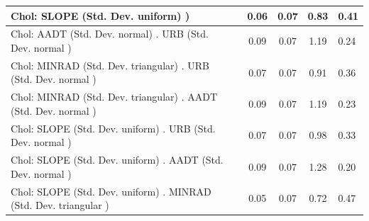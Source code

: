 \begin{table}
\begin{center}
\begin{tabular}{|l|l|c|c|c|l|}
			\hline
			 Chol: SLOPE (Std. Dev. uniform) ) &  & 0.06 & 0.07 & 0.83 & 0.41 \\
			\hline
			 Chol: AADT (Std. Dev. normal) . URB (Std. Dev.   normal ) &  & 0.09 & 0.07 & 1.19 & 0.24 \\
			\hline
			 Chol: MINRAD (Std. Dev. triangular) . URB (Std. Dev.   normal ) &  & 0.07 & 0.07 & 0.91 & 0.36 \\
			\hline
			 Chol: MINRAD (Std. Dev. triangular) . AADT (Std. Dev.   normal ) &  & 0.09 & 0.07 & 1.19 & 0.23 \\
			\hline
			 Chol: SLOPE (Std. Dev. uniform) . URB (Std. Dev.   normal ) &  & 0.07 & 0.07 & 0.98 & 0.33 \\
			\hline
			 Chol: SLOPE (Std. Dev. uniform) . AADT (Std. Dev.   normal ) &  & 0.09 & 0.07 & 1.28 & 0.20 \\
			\hline
			 Chol: SLOPE (Std. Dev. uniform) . MINRAD (Std. Dev.   triangular ) &  & 0.05 & 0.07 & 0.72 & 0.47 \\
			\hline
		\end{tabular}
	\end{center}
\end{table}